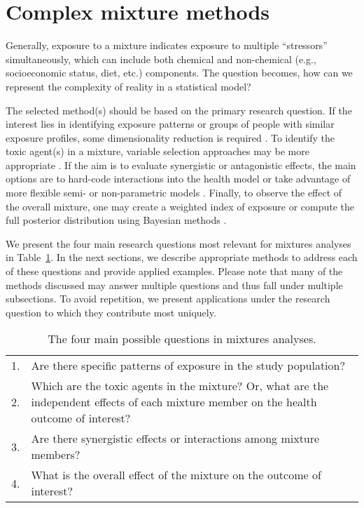 \section{Complex mixture methods}\label{sec:Methods}

Generally, exposure to a mixture indicates exposure to multiple ``stressors'' simultaneously, which can include both chemical and non-chemical (e.g., socioeconomic status, diet, etc.) components. The question becomes, how can we represent the complexity of reality in a statistical model? 

The selected method(s) should be based on the primary research question. If the interest lies in identifying exposure patterns or groups of people with similar exposure profiles, some dimensionality reduction is required \citep{jolliffe02, jolliffe02b, thompson04, paatero94}. To identify the toxic agent(s) in a mixture, variable selection approaches may be more appropriate \citep{tibshirani96, zou05}. If the aim is to evaluate synergistic or antagonistic effects, the main options are to hard-code interactions into the health model or take advantage of more flexible semi- or non-parametric models \citep{bobb2014bayesian,coull2015,bobb2018statistical}. Finally, to observe the effect of the overall mixture, one may create a weighted index of exposure or compute the full posterior distribution using Bayesian methods \citep{carrico15,bobb2014bayesian,coull2015}.

We present the four main research questions most relevant for mixtures analyses in Table~\ref{tab:qx}. In the next sections, we describe appropriate methods to address each of these questions and provide applied examples. Please note that many of the methods discussed may answer multiple questions and thus fall under multiple subsections. To avoid repetition, we present applications under the research question to which they contribute most uniquely. \\

\begin{table}[ht]
\begin{center}
\caption[The four main questions in mixtures analyses]{The four main possible questions in mixtures analyses.}
\label{tab:qx}
\begin{tabular}{|c p{15cm}|}
\hline
  1. & Are there specific patterns of exposure in the study population? \\
  2. & Which are the toxic agents in the mixture? Or, what are the independent effects of each mixture member on the health outcome of interest? \\
  3. & Are there synergistic effects or interactions among mixture members? \\
  4. & What is the overall effect of the mixture on the outcome of interest? \\
\hline
\end{tabular}
\end{center}
\end{table}
\vspace{-2em}

